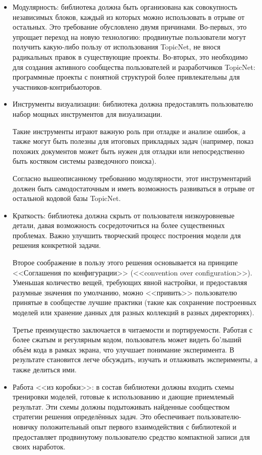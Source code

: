\begin{itemize}

\item{Модулярность: библиотека должна быть организована как совокупность независимых блоков, каждый из которых можно использовать в отрыве от остальных. Это требование обусловлено двумя причинами. Во-первых, это упрощает переход на новую технологию: продвинутые пользователи могут получить какую-либо пользу от использования TopicNet, не внося радикальных правок в существующие проекты. Во-вторых, это необходимо для создания активного сообщества пользователей и разработчиков TopicNet: программные проекты с понятной структурой более привлекательны для участников-контрибьюторов.} 

\item{Инструменты визуализации: библиотека должна предоставлять пользователю набор мощных инструментов для визуализации.

Такие инструменты играют важную роль при отладке и анализе ошибок, а также могут быть полезны для итоговых прикладных задач (например, показ похожих документов может быть нужен для отладки или непосредственно быть костяком системы разведочного поиска).

Согласно вышеописанному требованию модулярности, этот инструментарий должен быть самодостаточным и иметь возможность развиваться в отрыве от остальной кодовой базы TopicNet.} 

\item{Краткость: библиотека должна скрыть от пользователя низкоуровневые детали, давая возможность сосредоточиться на более существенных проблемах. Важно улучшить творческий процесс построения модели для решения конкретной задачи.  

Второе соображение в пользу этого решения основывается на принципе <<Соглашения по конфигурации>> (<<convention over configuration>>). Уменьшая количество вещей, требующих явной настройки, и предоставляя разумные значения по умолчанию, можно <<привить>> пользователю принятые в сообществе лучшие практики (такие как сохранение построенных моделей или хранение данных для разных коллекций в разных директориях).  

Третье преимущество заключается в читаемости и портируемости. Работая с более сжатым и регулярным кодом, пользователь может видеть бо'льший объём кода в рамках экрана, что улучшает понимание эксперимента. В результате становится легче обсуждать, изучать и отлаживать эксперименты, а также делиться ими.} 

\item{Работа <<из коробки>>: в состав библиотеки должны входить схемы тренировки моделей, готовые к использованию и дающие приемлемый результат. Эти схемы должны подытоживать найденные сообществом стратегии решения определённых задач. Это обеспечивает пользователю-новичку положительный опыт первого взаимодействия с библиотекой и предоставляет продвинутому пользователю средство компактной записи для своих наработок.} 

\end{itemize}

